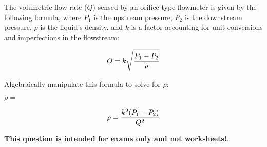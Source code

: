 

The volumetric flow rate ($Q$) sensed by an orifice-type flowmeter is given by the following formula, where $P_1$ is the upstream pressure, $P_2$ is the downstream pressure, $\rho$ is the liquid's density, and $k$ is a factor accounting for unit conversions and imperfections in the flowstream:
 
$$Q = k \sqrt{{P_1 - P_2} \over \rho}$$

Algebraically manipulate this formula to solve for $\rho$:

\vskip 20pt

$\rho = $







$$\rho = {k^2 (P_1 - P_2) \over Q^2} $$







{\bf This question is intended for exams only and not worksheets!}.



